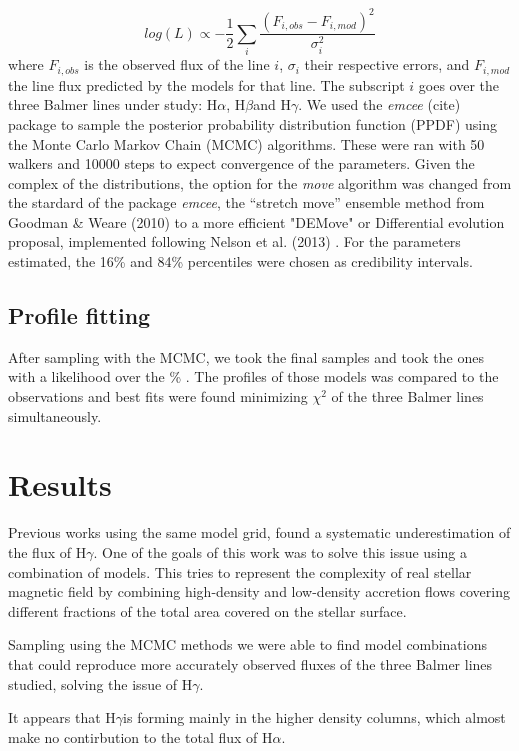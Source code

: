 \documentclass[twocolumn,linenumbers]{aastex631}
\newcommand{\halpha}{H$\alpha$}
\newcommand{\hbeta}{H$\beta$}
\newcommand{\hgamma}{H$\gamma$}
\begin{document}
\begin{equation}
    log (L) \propto -\frac{1}{2} \sum_i \frac{(F_{i,obs}-F_{i,mod})^2}{\sigma_{i}^2}
\end{equation}
where $F_{i,obs}$ is the observed flux of the line $i$, $\sigma_i$ their respective errors, and $F_{i,mod}$ the line flux predicted by the models for that line. The subscript $i$ goes over the three Balmer lines under study: \halpha, \hbeta and \hgamma. We used the \textit{emcee} (cite) package to sample the posterior probability distribution function (PPDF) using the Monte Carlo Markov Chain (MCMC) algorithms. These were ran with 50 walkers and 10000 steps to expect convergence of the parameters. Given the complex of the distributions, the option for the \textit{move} algorithm was changed from the stardard of the package \textit{emcee}, the “stretch move” ensemble method from Goodman \& Weare (2010) to a more efficient  "DEMove" or Differential evolution proposal, implemented following Nelson et al. (2013) . For the parameters estimated, the 16\% and 84\% percentiles were chosen as credibility intervals.

\subsection{Profile fitting}

After sampling with the MCMC, we took the final samples and took the ones with a likelihood over the \% . The profiles of those models was compared to the observations and best fits were found minimizing $\chi^2$ of the three Balmer lines simultaneously.

\section{Results}

Previous works using the same model grid, found a systematic underestimation of the flux of \hgamma. One of the goals of this work was to solve this issue using a combination of models. This tries to represent the complexity of real stellar magnetic field by combining high-density and low-density accretion flows covering different fractions of the total area covered on the stellar surface.

Sampling using the MCMC methods we were able to find model combinations that could reproduce more accurately observed fluxes of the three Balmer lines studied, solving the issue of \hgamma.

It appears that \hgamma is forming mainly in the higher density columns, which almost make no contirbution to the total flux of \halpha. 
\end{document}
